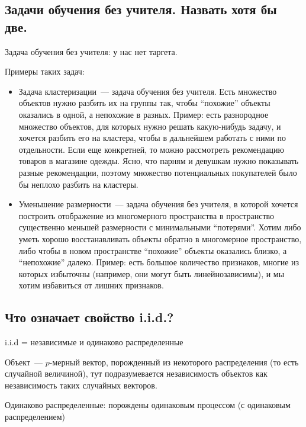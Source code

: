 \subsection{Задачи обучения без учителя. Назвать хотя бы две.}

\begin{note}
    Задача обучения без учителя: у нас нет таргета.

    Примеры таких задач:

    \begin{itemize}
        \item Задача кластеризации~--- задача обучения без учителя. Есть множество объектов нужно разбить их на группы так, чтобы “похожие” объекты оказались в одной, а непохожие в разных. Пример: есть разнородное множество объектов, для которых нужно решать какую-нибудь задачу, и хочется разбить его на кластера, чтобы в дальнейшем работать с ними по отдельности. Если еще конкретней, то можно рассмотреть рекомендацию товаров в магазине одежды. Ясно, что парням и девушкам нужно показывать разные рекомендации, поэтому множество потенциальных покупателей было бы неплохо разбить на кластеры.

        \item Уменьшение размерности~--- задача обучения без учителя, в которой хочется построить отображение из многомерного пространства в пространство существенно меньшей размерности с минимальными “потерями”. Хотим либо уметь хорошо восстанавливать объекты обратно в многомерное пространство, либо чтобы в новом пространстве “похожие” объекты оказались близко, а “непохожие” далеко. Пример: есть большое количество признаков, многие из которых избыточны (например, они могут быть линейнозависимы), и мы хотим избавиться от лишних признаков.
    \end{itemize}
\end{note}




\subsection{Что означает свойство i.i.d.?}

\begin{definition}
    i.i.d = независимые и одинаково распределенные
\end{definition}
\begin{note}
    Объект~--- $p$-мерный вектор, порожденный из некоторого распределения (то есть случайной величиной), тут подразумевается независимость объектов как независимость таких случайных векторов.
\end{note}
\begin{note}
    Одинаково распределенные: порождены одинаковым процессом (с одинаковым распределением)
\end{note}

